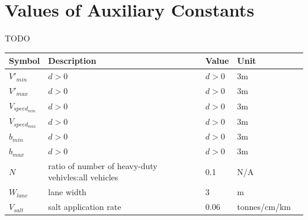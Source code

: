 \documentclass[12pt]{article}
\begin{document}



\section{Values of Auxiliary Constants} TODO




\begin{table}[!h]
  \caption{Input Variables} \label{TblInputVar}
  \renewcommand{\arraystretch}{1.2}
\noindent \begin{longtable*}{l l l l c} 
  \toprule
 \textbf{Symbol} & \textbf{Description} & \textbf{Value} & \textbf{Unit}\\

  \midrule 
  $V'_{min}$ & $d > 0$ & $d>0$ & 3m  \\
  $V'_{max}$ & $d > 0$ & $d>0$ & 3m   \\
  $V_{speed_{min}}$ & $d > 0$ & $d>0$ & 3m   \\
  $V_{speed_{max}}$ & $d > 0$ & $d>0$ & 3m 
  \\
  $b_{min}$ & $d > 0$ & $d>0$ & 3m 
  \\
  $b_{max}$ & $d > 0$ & $d>0$ & 3m 
  \\  
  $N$ & ratio of number of heavy-duty vehivles:all vehicles & 0.1 & N/A 
  \\
  $W_{lane}$ & lane width & 3 & m
  \\  
  $V_{salt}$ & salt application rate & 0.06 & tonnes/cm/km
  \\
  
  \bottomrule
\end{longtable*}
\end{table}
\end{document}
